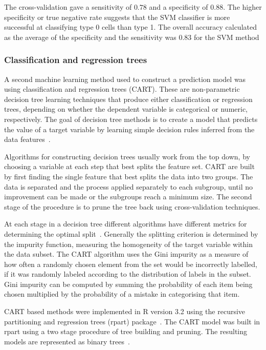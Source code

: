 The cross-validation gave a sensitivity of $0.78$ and a specificity of $0.88$. The higher specificity or true negative rate suggests that the SVM classifier is more successful at classifying type 0 cells than type 1. The overall accuracy calculated as the average of the specificity and the sensitivity was $0.83$ for the SVM method

\subsubsection{Classification and regression trees}
A second machine learning method used to construct a prediction model was using classification and regression trees (CART). These are non-parametric decision tree learning techniques that produce either classification or regression trees, depending on whether the dependent variable is categorical or numeric, respectively. The goal of decision tree methods is to create a model that predicts the value of a target variable by learning simple decision rules inferred from the data features~\cite{Breiman1984}.

Algorithms for constructing decision trees usually work from the top down, by choosing a variable at each step that best splits the feature set. CART are built by first finding the single feature that best splits the data into two groups. The data is separated and the process applied separately to each subgroup, until no improvement can be made or the subgroups reach a minimum size. The second stage of the procedure is to prune the tree back using cross-validation techniques.

At each stage in a decision tree different algorithms have different metrics for determining the optimal split~\cite{Rokach2005}. Generally the splitting criterion is determined by the impurity function, measuring the homogeneity of the target variable within the data subset. The CART algorithm uses the Gini impurity as a measure of how often a randomly chosen element from the set would be incorrectly labelled, if it was randomly labeled according to the distribution of labels in the subset. Gini impurity can be computed by summing the probability of each item being chosen multiplied by the probability of a mistake in categorising that item.

CART based methods were implemented in R version 3.2 using the recursive partitioning and regression trees (rpart) package~\cite{Therneau2015}. The CART model was built in rpart using a two stage procedure of tree building and pruning. The resulting models are represented as binary trees~\cite{Duda2000}.

